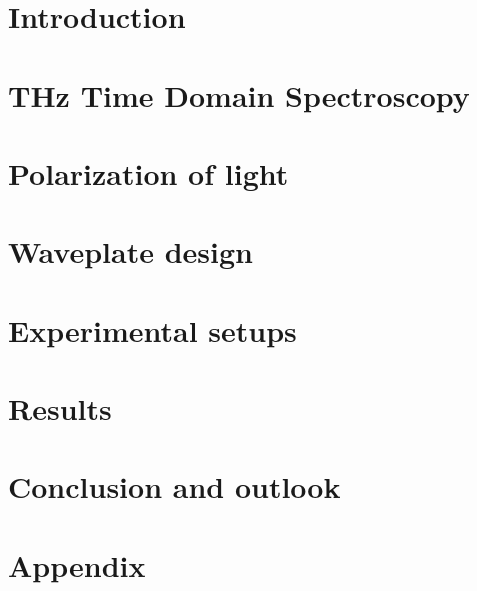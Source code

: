 \documentclass[12pt, a4paper]{report}
\begin{document}
\chapter{Introduction}
\setcounter{page}{1}


\chapter{THz Time Domain Spectroscopy}


\chapter{Polarization of light}


\chapter{Waveplate design}


\chapter{Experimental setups}


\chapter{Results}


\chapter{Conclusion and outlook}


\appendix
\chapter{Appendix}


\sloppy
\printbibliography

\end{document}
